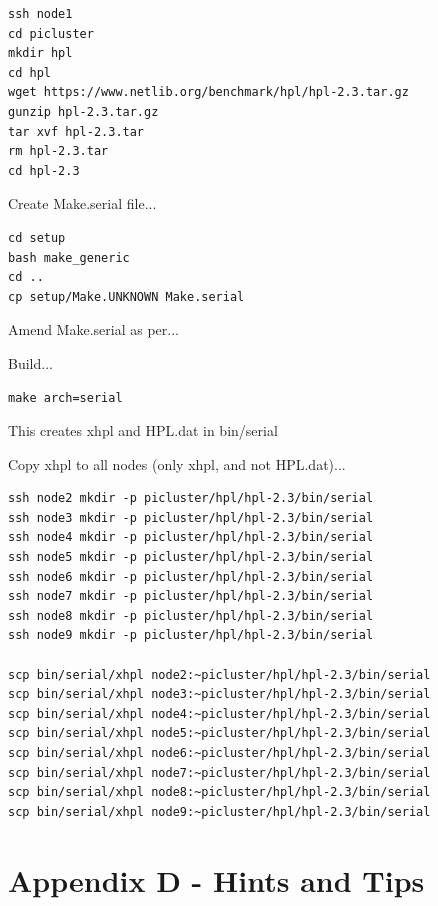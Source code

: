 \documentclass{article}
\begin{document}
\lstset{frameround=tttt}
\begin{lstlisting}[frame=single]
ssh node1
cd picluster
mkdir hpl
cd hpl
wget https://www.netlib.org/benchmark/hpl/hpl-2.3.tar.gz
gunzip hpl-2.3.tar.gz
tar xvf hpl-2.3.tar
rm hpl-2.3.tar
cd hpl-2.3
\end{lstlisting}

Create Make.serial file...

\lstset{frameround=tttt}
\begin{lstlisting}[frame=single]
cd setup
bash make_generic
cd ..
cp setup/Make.UNKNOWN Make.serial
\end{lstlisting}

Amend Make.serial as per...

Build...

\lstset{frameround=tttt}
\begin{lstlisting}[frame=single]
make arch=serial   
\end{lstlisting}

This creates xhpl and HPL.dat in bin/serial

Copy xhpl to all nodes (only xhpl, and not HPL.dat)...

\lstset{frameround=tttt}
\begin{lstlisting}[frame=single]
ssh node2 mkdir -p picluster/hpl/hpl-2.3/bin/serial
ssh node3 mkdir -p picluster/hpl/hpl-2.3/bin/serial
ssh node4 mkdir -p picluster/hpl/hpl-2.3/bin/serial
ssh node5 mkdir -p picluster/hpl/hpl-2.3/bin/serial
ssh node6 mkdir -p picluster/hpl/hpl-2.3/bin/serial
ssh node7 mkdir -p picluster/hpl/hpl-2.3/bin/serial
ssh node8 mkdir -p picluster/hpl/hpl-2.3/bin/serial
ssh node9 mkdir -p picluster/hpl/hpl-2.3/bin/serial

scp bin/serial/xhpl node2:~picluster/hpl/hpl-2.3/bin/serial
scp bin/serial/xhpl node3:~picluster/hpl/hpl-2.3/bin/serial
scp bin/serial/xhpl node4:~picluster/hpl/hpl-2.3/bin/serial
scp bin/serial/xhpl node5:~picluster/hpl/hpl-2.3/bin/serial
scp bin/serial/xhpl node6:~picluster/hpl/hpl-2.3/bin/serial
scp bin/serial/xhpl node7:~picluster/hpl/hpl-2.3/bin/serial
scp bin/serial/xhpl node8:~picluster/hpl/hpl-2.3/bin/serial
scp bin/serial/xhpl node9:~picluster/hpl/hpl-2.3/bin/serial
\end{lstlisting}



%
%
\clearpage\section{Appendix D - Hints and Tips}
\end{document}
